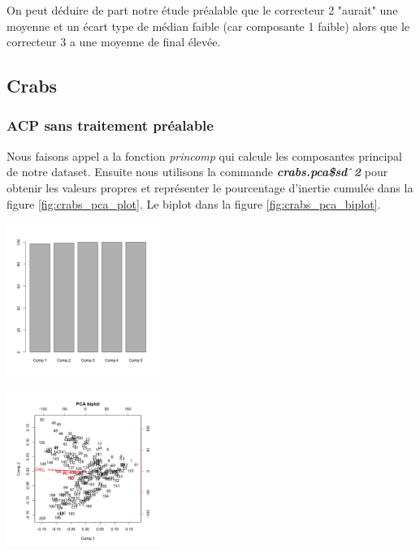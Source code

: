 \documentclass[10pt]{article}
\begin{document}
On peut déduire de part notre étude préalable que le correcteur 2 "aurait" une moyenne et un écart type de médian faible (car composante 1 faible) alors que le correcteur 3 a une moyenne de final élevée.

\subsection{Crabs}
\subsubsection{ACP sans traitement préalable}
	Nous faisons appel a la fonction \textit{princomp }qui calcule les composantes principal de notre dataset. Ensuite nous utilisons la commande  \textit{\textbf{crabs.pca\$sd$\string^$2}}   pour obtenir les valeurs propres et représenter le pourcentage d'inertie cumulée dans la figure \ref{fig:crabs_pca_plot}. Le biplot dans la figure \ref{fig:crabs_pca_biplot}.\\
	\begin{minipage}{.5\textwidth}
		\centering
		\includegraphics[width=50mm]{Figures/Crabs/pca_plot.png}
		\label{fig:crabs_pca_plot}
	\end{minipage}%
	\hspace{0.08\linewidth}
	\begin{minipage}{.5\textwidth}
		\centering
		\includegraphics[width=50mm]{Figures/Crabs/pca_biplot.png}
		\label{fig:crabs_pca_biplot}
	\end{minipage}
	\vspace{2mm}
	
\end{document}

